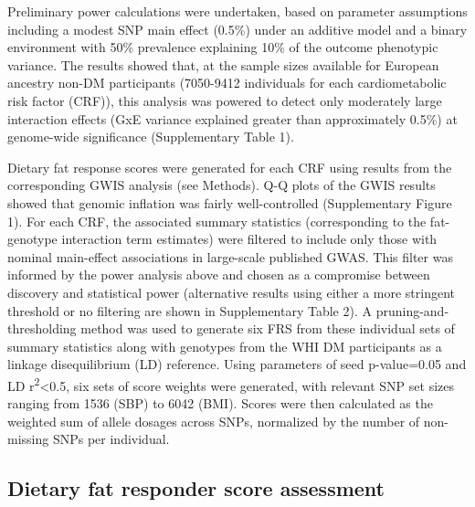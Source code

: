 \documentclass[]{article}
\begin{document}
Preliminary power calculations were undertaken, based on parameter
assumptions including a modest SNP main effect (0.5\%) under an additive
model and a binary environment with 50\% prevalence explaining 10\% of
the outcome phenotypic variance. The results showed that, at the sample
sizes available for European ancestry non-DM participants (7050-9412
individuals for each cardiometabolic risk factor (CRF)), this analysis
was powered to detect only moderately large interaction effects (GxE
variance explained greater than approximately 0.5\%) at genome-wide
significance (Supplementary Table 1).

Dietary fat response scores were generated for each CRF using results
from the corresponding GWIS analysis (see Methods). Q-Q plots of the
GWIS results showed that genomic inflation was fairly well-controlled
(Supplementary Figure 1). For each CRF, the associated summary
statistics (corresponding to the fat-genotype interaction term
estimates) were filtered to include only those with nominal main-effect
associations in large-scale published GWAS. This filter was informed by
the power analysis above and chosen as a compromise between discovery
and statistical power (alternative results using either a more stringent
threshold or no filtering are shown in Supplementary Table 2). A
pruning-and-thresholding method was used to generate six FRS from these
individual sets of summary statistics along with genotypes from the WHI
DM participants as a linkage disequilibrium (LD) reference. Using
parameters of seed p-value=0.05 and LD
r\textsuperscript{2}\textless{}0.5, six sets of score weights were
generated, with relevant SNP set sizes ranging from 1536 (SBP) to 6042
(BMI). Scores were then calculated as the weighted sum of allele dosages
across SNPs, normalized by the number of non-missing SNPs per
individual.

\hypertarget{dietary-fat-responder-score-assessment}{%
\subsection{Dietary fat responder score
assessment}\label{dietary-fat-responder-score-assessment}}
\end{document}
